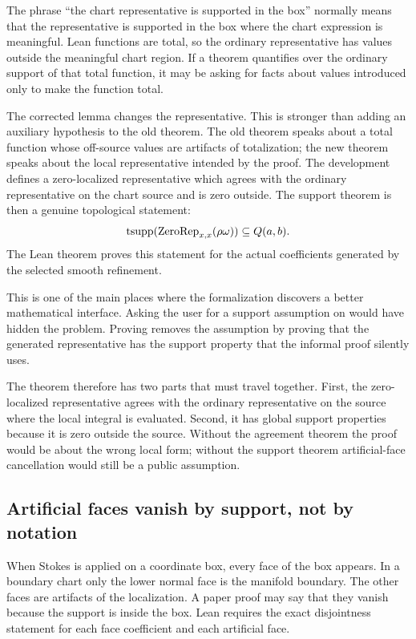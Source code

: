 The phrase ``the chart representative is supported in the box'' normally means
that the representative is supported in the box where the chart expression is
meaningful.  Lean functions are total, so the ordinary representative has
values outside the meaningful chart region.  If a theorem quantifies over the
ordinary support of that total function, it may be asking for facts about
values introduced only to make the function total.

The corrected lemma changes the representative.  This is stronger than adding
an auxiliary hypothesis to the old theorem.  The old theorem speaks about a
total function whose off-source values are artifacts of totalization; the new
theorem speaks about the local representative intended by the proof.  The
development defines a zero-localized representative which agrees with the
ordinary representative on the chart source and is zero outside.  The support
theorem is then a genuine topological statement:
\[
  \operatorname{tsupp}(\operatorname{ZeroRep}_{x,x}(\rho\omega))
  \subseteq Q(a,b).
\]
The Lean theorem
 proves this statement for the
actual coefficients generated by the selected smooth refinement.

This is one of the main places where the formalization discovers a better
mathematical interface.  Asking the user for a support assumption on
 would have hidden the problem.  Proving
 removes the assumption by proving
that the generated representative has the support property that the informal
proof silently uses.

The theorem therefore has two parts that must travel together.  First, the
zero-localized representative agrees with the ordinary representative on the
source where the local integral is evaluated.  Second, it has global support
properties because it is zero outside the source.  Without the agreement
theorem the proof would be about the wrong local form; without the support
theorem artificial-face cancellation would still be a public assumption.

\subsection{Artificial faces vanish by support, not by notation}

When Stokes is applied on a coordinate box, every face of the box appears.  In
a boundary chart only the lower normal face is the manifold boundary.  The
other faces are artifacts of the localization.  A paper proof may say that
they vanish because the support is inside the box.  Lean requires the exact
disjointness statement for each face coefficient and each artificial face.

